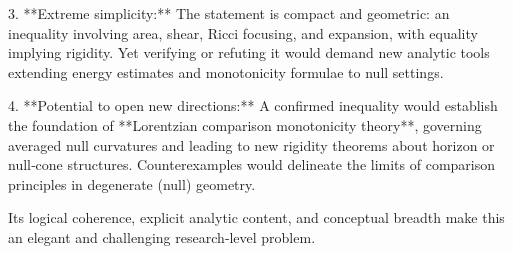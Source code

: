3. **Extreme simplicity:**  
The statement is compact and geometric: an inequality involving area, shear, Ricci focusing, and expansion, with equality implying rigidity.  Yet verifying or refuting it would demand new analytic tools extending energy estimates and monotonicity formulae to null settings.

4. **Potential to open new directions:**  
A confirmed inequality would establish the foundation of **Lorentzian comparison monotonicity theory**, governing averaged null curvatures and leading to new rigidity theorems about horizon or null‑cone structures.  Counterexamples would delineate the limits of comparison principles in degenerate (null) geometry.

Its logical coherence, explicit analytic content, and conceptual breadth make this an elegant and challenging research‑level problem.